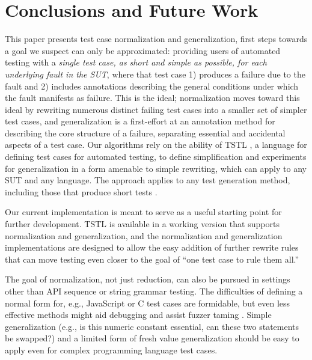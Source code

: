 \section{Conclusions and Future Work}

This paper presents test case normalization and generalization, first
steps towards a goal we suspect can only be approximated: providing
users of automated testing with a \emph{single test case, as short and
  simple as possible, for each underlying fault in the SUT}, where
that test case 1) produces a failure due to the fault and 2) includes
annotations describing the general conditions under which the fault
manifests as failure.  This is the ideal; normalization moves toward
this ideal by rewriting numerous distinct failing test cases into a
smaller set of simpler test cases, and generalization is a
first-effort at an annotation method for describing the core structure
of a failure, separating essential and accidental aspects of a test
case.  Our algorithms rely on the ability of TSTL \cite{NFM15,ISSTA15}, a language for
defining test cases for automated testing, to define simplification
and experiments for generalization in a form amenable to simple
rewriting, which can apply to any SUT and any language.  The approach applies to any test generation
method, including those that produce short tests \cite{FA11,SoftBET}.

Our current implementation is meant to serve as a useful starting
point for further development.  TSTL is available in a working version
\cite{tstl} that supports normalization and generalization, and the
normalization and generalization implementations are designed to allow
the easy addition of further rewrite rules that can move testing even closer to
the goal of ``one test case to rule them all.''

The goal of normalization, not just
reduction, can also be pursued in settings other than API sequence or
string grammar testing.  The difficulties of defining a normal form
for, e.g., JavaScript \cite{jsfunfuzz} or C \cite{CReduce} test cases
are formidable, but even less effective methods might aid debugging and assist fuzzer taming
\cite{PLDI13}.  Simple generalization (e.g., is this numeric constant
essential, can these two statements be swapped?) and a limited form of
fresh value generalization should be easy to apply
even for complex programming language test cases.

